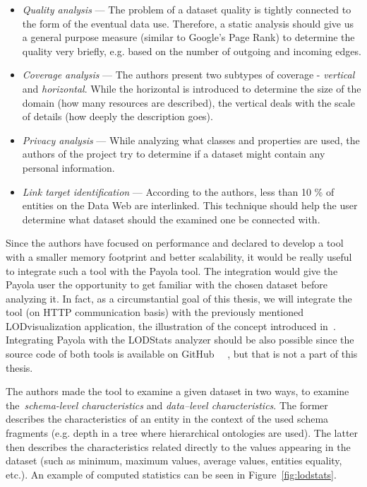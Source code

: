 \begin{itemize}
  \item \emph{Quality analysis} --- The problem of a dataset quality is tightly connected 
  to the form of the eventual data use. Therefore, a static analysis should 
  give us a general purpose measure (similar to Google's Page Rank) to determine the 
  quality very briefly, e.g. based on the number of outgoing and incoming 
  edges.
  
  \item \emph{Coverage analysis} --- The authors present two subtypes of 
  coverage - \emph{vertical} and \emph{horizontal}.  While the horizontal is 
  introduced to determine the size of the domain (how many resources are described),
  the vertical deals with the scale of details (how deeply the description goes).
  
  \item \emph{Privacy analysis} --- While analyzing what classes and properties 
  are used, the authors of the project try to determine if a dataset 
  might contain any personal information.
  
  \item \emph{Link target identification} --- According to the authors, less than 
  10 \% of entities on the Data Web are interlinked. This technique 
  should help the user determine what dataset should the examined one be 
  connected with.
\end{itemize}

Since the authors have focused on performance and declared to develop a 
tool with a smaller memory footprint and better scalability, it 
would be really useful to integrate such a tool with the Payola tool.
The integration would give the Payola user the opportunity to get familiar with the 
chosen dataset before analyzing it. In fact, as a circumstantial goal of this 
thesis, we will integrate the tool (on HTTP communication basis) with the previously mentioned 
LODvisualization application, the illustration of the concept introduced 
in~\cite{ldvm}. Integrating Payola with the LODStats analyzer should be also 
possible since the source code of both tools is available on GitHub~\cite{github-payola} 
~\cite{github-lodstats}, but that is not a part of this thesis.

The authors made the tool to examine a given dataset in two ways, to examine 
the~\emph{schema-level characteristics} and \emph{data--level characteristics}. 
The former describes the characteristics of an entity in the context of the used 
schema fragments (e.g. depth in a tree where hierarchical ontologies are used). 
The latter then describes the characteristics related directly to the values 
appearing in the dataset (such as minimum, maximum values, average values, entities equality, 
etc.). An example of computed statistics can be seen in 
Figure~\ref{fig:lodstats}.

